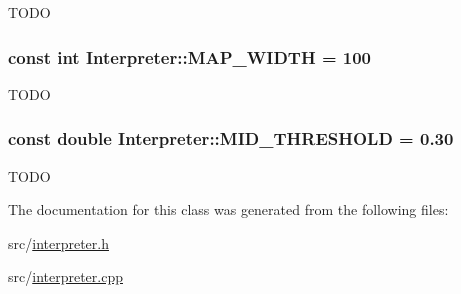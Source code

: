 \label{classInterpreter_abda6b21064d50acd844bda3ed551e263}
TODO \hypertarget{classInterpreter_a30c4dceff341b5e7cd36fdaba21aeaa9}{
\subsubsection[{MAP\_\-WIDTH}]{\setlength{\rightskip}{0pt plus 5cm}const int {\bf Interpreter::MAP\_\-WIDTH} = 100}}
\label{classInterpreter_a30c4dceff341b5e7cd36fdaba21aeaa9}
TODO \hypertarget{classInterpreter_ad1c3ae1b11b176d50b5e8dcbf4b8b09e}{
\subsubsection[{MID\_\-THRESHOLD}]{\setlength{\rightskip}{0pt plus 5cm}const double {\bf Interpreter::MID\_\-THRESHOLD} = 0.30}}
\label{classInterpreter_ad1c3ae1b11b176d50b5e8dcbf4b8b09e}
TODO 

The documentation for this class was generated from the following files:\begin{DoxyCompactItemize}
\item 
src/\hyperlink{interpreter_8h}{interpreter.h}\item 
src/\hyperlink{interpreter_8cpp}{interpreter.cpp}\end{DoxyCompactItemize}
